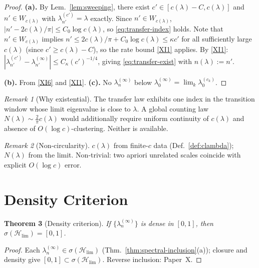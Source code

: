 \documentclass[12pt,a4paper]{amsart}
\newtheorem{theorem}{Theorem}[section]
\theoremstyle{definition}
\theoremstyle{remark}
\newtheorem{remark}[theorem]{Remark}
\newcommand{\Hlim}{\mathcal{H}_{\lim}}
\begin{document}
\begin{proof}
\textbf{(a).}
By Lem.~\ref{lem:sweeping}, there exist
$c'\in[c(\lambda)-C, c(\lambda)]$
and $n'\in W_{c(\lambda)}$ with
$\lambda_{n'}^{(c')}=\lambda$ exactly.
Since $n'\in W_{c(\lambda)}$,
$|n'-2c(\lambda)/\pi|\le C_0\log c(\lambda)$,
so \eqref{eq:transfer-index} holds.
Note that $n'\in W_{c(\lambda)}$ implies
$n' \le 2c(\lambda)/\pi + C_0\log c(\lambda)
\le \kappa c'$ for all sufficiently large
$c(\lambda)$ (since $c' \ge c(\lambda) - C$),
so the rate bound \eqref{XI1} applies.
By \eqref{XI1}:
$|\lambda_{n'}^{(c')} - \lambda_{n'}^{(\infty)}|
\le C_\kappa (c')^{-1/4}$,
giving \eqref{eq:transfer-exist} with
$n(\lambda):=n'$.

\textbf{(b).} From \eqref{XI6} and \eqref{XI1}.
\textbf{(c).}
No $\lambda_n^{(\infty)}$ below
$\lambda_0^{(\infty)}=\lim_k\lambda_0^{(c_k)}$.
\end{proof}

\begin{remark}[Why existential]
\label{rem:weyl-existential}
The transfer law exhibits one index in the
transition window whose limit eigenvalue is
close to $\lambda$.
A global counting law
$N(\lambda)\sim\frac{2}{\pi}c(\lambda)$
would additionally require uniform continuity
of $c(\lambda)$ and absence of $O(\log c)$-clustering.
Neither is available.
\end{remark}

\begin{remark}[Non-circularity]
$c(\lambda)$ from finite-$c$ data
(Def.~\ref{def:clambda});
$N(\lambda)$ from the limit.
Non-trivial: two apriori unrelated scales
coincide with explicit $O(\log c)$ error.
\end{remark}

\section{Density Criterion}
\label{sec:density}

\begin{theorem}[Density criterion]
\label{thm:density-criterion}
If $\{\lambda_n^{(\infty)}\}$ is dense in $[0,1]$,
then $\sigma(\Hlim)=[0,1]$.
\end{theorem}
\begin{proof}
Each $\lambda_n^{(\infty)}\in\sigma(\Hlim)$
(Thm.~\ref{thm:spectral-inclusion}(a));
closure and density give
$[0,1]\subset\sigma(\Hlim)$.
Reverse inclusion: Paper~X.
\end{proof}
\end{document}
